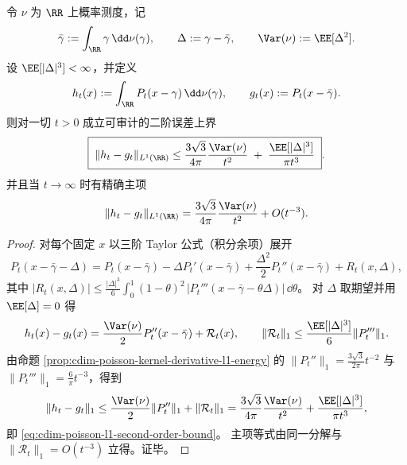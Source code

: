 \begin{proposition}\label{prop:cdim-poisson-l1-second-order-constant}
令 \(\nu\) 为 \(\RR\) 上概率测度，记
\[
\bar\gamma:=\int_{\RR}\gamma\,\dd\nu(\gamma),
\qquad
\Delta:=\gamma-\bar\gamma,
\qquad
\Var(\nu):=\EE[\Delta^2].
\]
设 \(\EE[|\Delta|^3]<\infty\)，并定义
\[
h_t(x):=\int_{\RR}P_t(x-\gamma)\,\dd\nu(\gamma),
\qquad
g_t(x):=P_t(x-\bar\gamma).
\]
则对一切 \(t>0\) 成立可审计的二阶误差上界
\begin{equation}\label{eq:cdim-poisson-l1-second-order-bound}
\boxed{\;
\|h_t-g_t\|_{L^{1}(\RR)}
\le
\frac{3\sqrt3}{4\pi}\frac{\Var(\nu)}{t^{2}}
\;+\;\frac{\EE[|\Delta|^{3}]}{\pi t^{3}}\; }.
\end{equation}
并且当 \(t\to\infty\) 时有精确主项
\[
\|h_t-g_t\|_{L^{1}(\RR)}
=\frac{3\sqrt3}{4\pi}\frac{\Var(\nu)}{t^{2}}+O(t^{-3}).
\]
\end{proposition}
\begin{proof}
对每个固定 \(x\) 以三阶 Taylor 公式（积分余项）展开
\[
P_t(x-\bar\gamma-\Delta)
=P_t(x-\bar\gamma)-\Delta P_t'(x-\bar\gamma)+\frac{\Delta^2}{2}P_t''(x-\bar\gamma)+R_t(x,\Delta),
\]
其中
\(
|R_t(x,\Delta)|
\le
\frac{|\Delta|^3}{6}\int_0^1(1-\theta)^2\,|P_t'''(x-\bar\gamma-\theta\Delta)|\,\dd\theta
\)。
对 \(\Delta\) 取期望并用 \(\EE[\Delta]=0\) 得
\[
h_t(x)-g_t(x)=\frac{\Var(\nu)}{2}P_t''(x-\bar\gamma)+\mathcal R_t(x),
\qquad
\|\mathcal R_t\|_{1}\le \frac{\EE[|\Delta|^3]}{6}\|P_t'''\|_{1}.
\]
由命题 \ref{prop:cdim-poisson-kernel-derivative-l1-energy} 的
\(\|P_t''\|_{1}=\frac{3\sqrt3}{2\pi}t^{-2}\) 与 \(\|P_t'''\|_{1}=\frac{6}{\pi}t^{-3}\)，得到
\[
\|h_t-g_t\|_{1}
\le \frac{\Var(\nu)}{2}\|P_t''\|_{1}+\|\mathcal R_t\|_{1}
=\frac{3\sqrt3}{4\pi}\frac{\Var(\nu)}{t^{2}}+\frac{\EE[|\Delta|^3]}{\pi t^{3}},
\]
即 \eqref{eq:cdim-poisson-l1-second-order-bound}。
主项等式由同一分解与 \(\|\mathcal R_t\|_{1}=O(t^{-3})\) 立得。证毕。
\end{proof}


